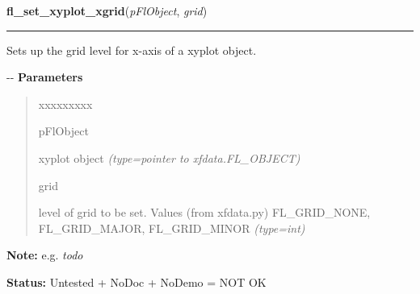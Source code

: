 \hspace{.8\funcindent}\begin{boxedminipage}{\funcwidth}

    \raggedright \textbf{fl\_set\_xyplot\_xgrid}(\textit{pFlObject}, \textit{grid})

    \vspace{-1.5ex}

    \rule{\textwidth}{0.5\fboxrule}
\setlength{\parskip}{2ex}

Sets up the grid level for x-axis of a xyplot object.

-{}-
\setlength{\parskip}{1ex}
      \textbf{Parameters}
      \vspace{-1ex}

      \begin{quote}
        \begin{Ventry}{xxxxxxxxx}

          \item[pFlObject]


xyplot object
            {\it (type=pointer to xfdata.FL\_OBJECT)}

          \item[grid]


level of grid to be set. Values (from xfdata.py) FL\_GRID\_NONE,
FL\_GRID\_MAJOR, FL\_GRID\_MINOR
            {\it (type=int)}

        \end{Ventry}

      \end{quote}

\textbf{Note:} 
e.g. \emph{todo}


\textbf{Status:} 
Untested + NoDoc + NoDemo = NOT OK


    \end{boxedminipage}

    \label{xformslib:flxyplot:fl_set_xyplot_ygrid}

    \vspace{0.5ex}

